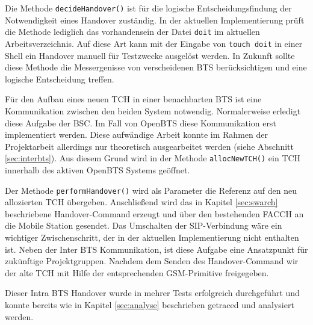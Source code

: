 Die Methode \lstinline{decideHandover()} ist für die logische Entscheidungsfindung der Notwendigkeit eines Handover zuständig. In der aktuellen Implementierung prüft die Methode lediglich das vorhandensein der Datei \lstinline{doit} im aktuellen Arbeitsverzeichnis. Auf diese Art kann mit der Eingabe von \lstinline{touch doit} in einer Shell ein Handover manuell für Testzwecke ausgelöst werden. In Zukunft sollte diese Methode die Messergenisse von verscheidenen BTS berücksichtigen und eine logische Entscheidung treffen.

Für den Aufbau eines neuen TCH in einer benachbarten BTS ist eine Kommunikation zwischen den beiden System notwendig. Normalerweise erledigt diese Aufgabe der BSC. Im Fall von OpenBTS diese Kommunikation erst implementiert werden. Diese aufwändige Arbeit konnte im Rahmen der Projektarbeit allerdings nur theoretisch ausgearbeitet werden (siehe Abschnitt \ref{sec:interbts}). Aus diesem Grund wird in der Methode \lstinline{allocNewTCH()} ein TCH innerhalb des aktiven OpenBTS Systems geöffnet.

Der Methode \lstinline{performHandover()} wird als Parameter die Referenz auf den neu allozierten TCH übergeben. Anschließend wird das in Kapitel \ref{sec:swarch} beschriebene Handover-Command erzeugt und über den bestehenden FACCH an die Mobile Station gesendet. Das Umschalten der SIP-Verbindung wäre ein wichtiger Zwischenschritt, der in der aktuellen Implementierung nicht enthalten ist. Neben der Inter BTS Kommunikation, ist diese Aufgabe eine Ansatzpunkt für zukünftige Projektgruppen. Nachdem dem Senden des Handover-Command wir der alte TCH mit Hilfe der entsprechenden GSM-Primitive freigegeben.

Dieser Intra BTS Handover wurde in mehrer Tests erfolgreich durchgeführt und konnte bereits wie in Kapitel \ref{sec:analyse} beschrieben getraced und analysiert werden.
